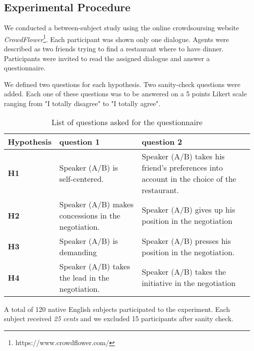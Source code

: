 \documentclass{llncs}
\begin{document}
		
	\subsection{Experimental Procedure}
	
	We conducted a between-subject study using the online crowdsoursing website \emph{CrowdFlower}\footnote{https://www.crowdflower.com/}. 
	Each participant was shown only one dialogue. Agents were described as two friends trying to find a restaurant where to have dinner. %
	Participants were invited to read the assigned dialogue and answer a questionnaire. 
	
	We defined  two questions for each hypothesis. Two sanity-check questions were added. Each one of these questions was to be answered on a 5 points Likert scale ranging from "I totally disagree" to "I totally agree".
	
	\begin{table}
		{\scriptsize
		\begin{tabular}{|p{1.75cm}|p{5cm}|p{5.5cm}|}
			\hline
			Hypothesis &question 1& question 2 \\
			\hline
			\textbf{H1} &Speaker (A/B) is self-centered. &Speaker (A/B) takes his friend's preferences into account in the choice of the restaurant.\\
			\hline
			\textbf{H2} &Speaker (A/B) makes concessions in the negotiation.&Speaker (A/B) gives up his position in the negotiation\\
			\hline
			\textbf{H3} & Speaker (A/B) is demanding&Speaker (A/B) presses his position in the negotiation. \\
			\hline
			\textbf{H4} &Speaker (A/B) takes the lead in the negotiation.&Speaker (A/B) takes the initiative in the negotiation \\
			\hline
		\end{tabular}
		}
		\caption{List of questions asked for the questionnaire}
		\label{table:questionnaire}
	\end{table}
	A total of 120 native English subjects participated to the experiment. Each subject received \textit{25 cents} and we excluded 15 participants after sanity check.
	
\end{document}
